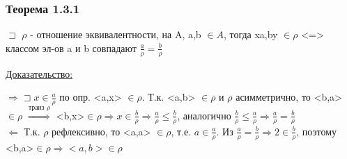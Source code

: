 \documentclass[12pt]{article}
\begin{document}
    \subsubsection*{Теорема 1.3.1}\label{th:1.3.1} 
    $\sqsupset$ $\rho$ - отношение эквивалентности, на A, a,b $\in A$, тогда xa,by $\in \rho$
    <=> классом эл-ов a и b совпадают $\frac{a}{\rho}=\frac{b}{\rho}$\par\noindent
    \underline{Доказательство:}
    \begin{adjustwidth}{1.5em}{1.5em}
        $\Rightarrow \sqsupset x \in \frac{a}{\rho}$ по опр. <a,x> $\in \rho$. Т.к. <a,b>
        $\in \rho$ и $\rho$ асимметрично, то <b,a> $\in \rho$ $\overset{\text{транз $\rho$}}{\Rightarrow}$
        <b,x>$\in \rho \Rightarrow x \in \frac{b}{\rho} \Rightarrow \frac{a}{\rho}\leq \frac{b}{\rho}$,
        аналогично $\frac{b}{\rho}\leq\frac{a}{\rho} \Rightarrow \frac{a}{\rho}=\frac{b}{\rho}$\\
        $\Leftarrow$ Т.к. $\rho$ рефлексивно, то <a,a> $\in \rho$, т.е. $a \in \frac{a}{\rho}$. Из
        $\frac{a}{\rho}=\frac{b}{\rho} \Rightarrow 2 \in \frac{b}{\rho}$, поэтому <b,a>$\in \rho
        \Rightarrow <a,b> \in \rho$
    \end{adjustwidth}
\end{document}

